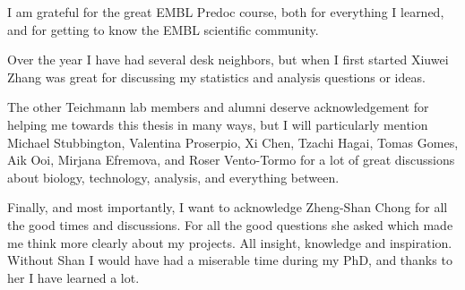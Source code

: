 \begin{acknowledgements}
I am grateful for the great EMBL Predoc course, both for everything I learned, and for getting to know the EMBL scientific community.

Over the year I have had several desk neighbors, but when I first started Xiuwei Zhang was great for discussing my statistics and analysis questions or ideas.

The other Teichmann lab members and alumni deserve acknowledgement for helping me towards this thesis in many ways, but I will particularly mention Michael Stubbington, Valentina Proserpio, Xi Chen, Tzachi Hagai, Tomas Gomes, Aik Ooi, Mirjana Efremova, and Roser Vento-Tormo for a lot of great discussions about biology, technology, analysis, and everything between.

Finally, and most importantly, I want to acknowledge Zheng-Shan Chong for all the good times and discussions. For all the good questions she asked which made me think more clearly about my projects. All insight, knowledge and inspiration. Without Shan I would have had a miserable time during my PhD, and thanks to her I have learned a lot.

\end{acknowledgements}
